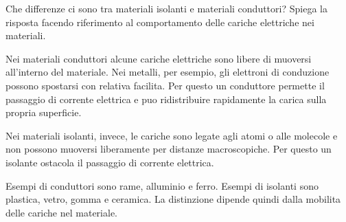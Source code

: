 
\begin{esercizio}
Che differenze ci sono tra materiali isolanti e materiali conduttori? Spiega la
risposta facendo riferimento al comportamento delle cariche elettriche nei
materiali.
\end{esercizio}

\begin{soluzione}
Nei materiali conduttori alcune cariche elettriche sono libere di muoversi
all'interno del materiale. Nei metalli, per esempio, gli elettroni di
conduzione possono spostarsi con relativa facilita. Per questo un conduttore
permette il passaggio di corrente elettrica e puo ridistribuire rapidamente la
carica sulla propria superficie.

Nei materiali isolanti, invece, le cariche sono legate agli atomi o alle
molecole e non possono muoversi liberamente per distanze macroscopiche. Per
questo un isolante ostacola il passaggio di corrente elettrica.

Esempi di conduttori sono rame, alluminio e ferro. Esempi di isolanti sono
plastica, vetro, gomma e ceramica. La distinzione dipende quindi dalla
mobilita delle cariche nel materiale.
\end{soluzione}
